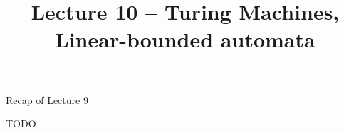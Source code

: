 \documentclass[handout]{beamer}
\title{Lecture 10 -- Turing Machines, Linear-bounded automata}
\begin{document}
\frame{\titlepage}


\begin{frame}{Recap of Lecture 9}
	
    TODO
	
\end{frame}
\end{document}
